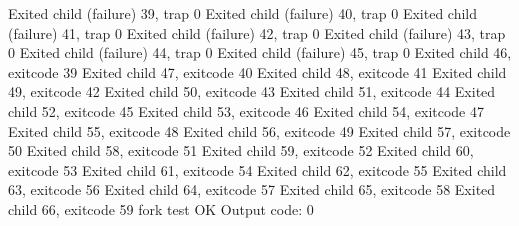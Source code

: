 \begin{listing}[style=consola]
    Exited child (failure) 39, trap 0
    Exited child (failure) 40, trap 0
    Exited child (failure) 41, trap 0
    Exited child (failure) 42, trap 0
    Exited child (failure) 43, trap 0
    Exited child (failure) 44, trap 0
    Exited child (failure) 45, trap 0
    Exited child 46, exitcode 39
    Exited child 47, exitcode 40
    Exited child 48, exitcode 41
    Exited child 49, exitcode 42
    Exited child 50, exitcode 43
    Exited child 51, exitcode 44
    Exited child 52, exitcode 45
    Exited child 53, exitcode 46
    Exited child 54, exitcode 47
    Exited child 55, exitcode 48
    Exited child 56, exitcode 49
    Exited child 57, exitcode 50
    Exited child 58, exitcode 51
    Exited child 59, exitcode 52
    Exited child 60, exitcode 53
    Exited child 61, exitcode 54
    Exited child 62, exitcode 55
    Exited child 63, exitcode 56
    Exited child 64, exitcode 57
    Exited child 65, exitcode 58
    Exited child 66, exitcode 59
    fork test OK
    Output code: 0
\end{listing}